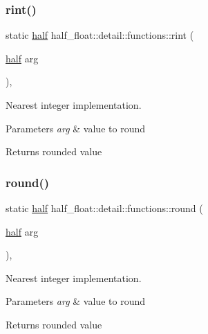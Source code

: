 \subsubsection{\texorpdfstring{rint()}{rint()}}
{\footnotesize\ttfamily static \hyperlink{classhalf__float_1_1half}{half} half\+\_\+float\+::detail\+::functions\+::rint (\begin{DoxyParamCaption}\item[{\hyperlink{classhalf__float_1_1half}{half}}]{arg }\end{DoxyParamCaption})\hspace{0.3cm}{\ttfamily [inline]}, {\ttfamily [static]}}

Nearest integer implementation. 
\begin{DoxyParams}{Parameters}
{\em arg} & value to round \\
\hline
\end{DoxyParams}
\begin{DoxyReturn}{Returns}
rounded value 
\end{DoxyReturn}
\mbox{\label{structhalf__float_1_1detail_1_1functions_a2f34968b39ed058747382fad81b81d4e}} 
\subsubsection{\texorpdfstring{round()}{round()}}
{\footnotesize\ttfamily static \hyperlink{classhalf__float_1_1half}{half} half\+\_\+float\+::detail\+::functions\+::round (\begin{DoxyParamCaption}\item[{\hyperlink{classhalf__float_1_1half}{half}}]{arg }\end{DoxyParamCaption})\hspace{0.3cm}{\ttfamily [inline]}, {\ttfamily [static]}}

Nearest integer implementation. 
\begin{DoxyParams}{Parameters}
{\em arg} & value to round \\
\hline
\end{DoxyParams}
\begin{DoxyReturn}{Returns}
rounded value 
\end{DoxyReturn}
\mbox{\label{structhalf__float_1_1detail_1_1functions_adb515e8e2f5a4dd8fde43e5a6700525f}} 
